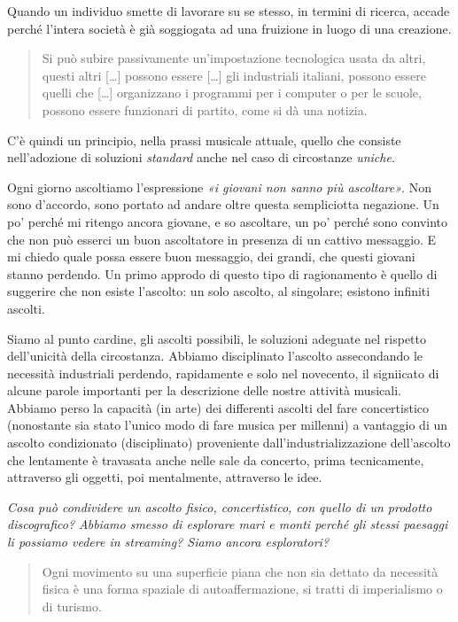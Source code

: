 \documentclass[a4paper,11pt]{article}
\begin{document}
Quando un individuo smette di lavorare su se stesso, in termini di
ricerca, accade perché l'intera società è già soggiogata ad una
fruizione in luogo di una creazione.

\begin{quote}
Si può subire passivamente un'impostazione tecnologica usata da altri,
questi altri {[}\ldots{}{]} possono essere {[}\ldots{}{]} gli industriali italiani,
possono essere quelli che {[}\ldots{}{]} organizzano i programmi per i
computer o per le scuole, possono essere funzionari di partito, come
si dà una notizia.
\end{quote}

C'è quindi un principio, nella prassi musicale attuale, quello che
consiste nell'adozione di soluzioni \emph{standard} anche nel caso di
circostanze \emph{uniche}.

Ogni giorno ascoltiamo l'espressione \emph{«i giovani non sanno più
ascoltare»}. Non sono d'accordo, sono portato ad andare oltre questa
sempliciotta negazione. Un po' perché mi ritengo ancora giovane, e so
ascoltare, un po' perché sono convinto che non può esserci un buon
ascoltatore in presenza di un cattivo messaggio. E mi chiedo quale possa
essere buon messaggio, dei grandi, che questi giovani stanno perdendo.
Un primo approdo di questo tipo di ragionamento è quello di suggerire
che non esiste l'ascolto: un solo ascolto, al singolare; esistono
infiniti ascolti.

Siamo al punto cardine, gli ascolti possibili, le soluzioni adeguate nel
rispetto dell'unicità della circostanza. Abbiamo disciplinato l'ascolto
assecondando le necessità industriali perdendo, rapidamente e solo nel
novecento, il signiicato di alcune parole importanti per la descrizione
delle nostre attività musicali. Abbiamo perso la capacità (in arte) dei
differenti ascolti del fare concertistico (nonostante sia stato l'unico
modo di fare musica per millenni) a vantaggio di un ascolto condizionato
(disciplinato) proveniente dall'industrializzazione dell'ascolto che
lentamente è travasata anche nelle sale da concerto, prima tecnicamente,
attraverso gli oggetti, poi mentalmente, attraverso le idee.

\emph{Cosa può condividere un ascolto fisico, concertistico, con quello di un
prodotto discografico? Abbiamo smesso di esplorare mari e monti perché
gli stessi paesaggi li possiamo vedere in streaming? Siamo ancora
esploratori?}

\begin{quote}
Ogni movimento su una superficie piana che non sia dettato da
necessità fisica è una forma spaziale di autoaffermazione, si tratti
di imperialismo o di turismo.
\end{quote}
\end{document}
